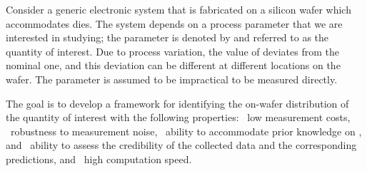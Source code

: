 Consider a generic electronic system that is fabricated on a silicon wafer which
accommodates \nd dies. The system depends on a process parameter that we are
interested in studying; the parameter is denoted by \g and referred to as the
quantity of interest. Due to process variation, the value of \g deviates from
the nominal one, and this deviation can be different at different locations on
the wafer. The parameter is assumed to be impractical to be measured directly.

The goal is to develop a framework for identifying the on-wafer distribution of
the quantity of interest \g with the following properties: \one~low measurement
costs, \two~robustness to measurement noise, \three~ability to accommodate prior
knowledge on \g, and \four~ability to assess the credibility of the collected
data and the corresponding predictions, and \five~high computation speed.
